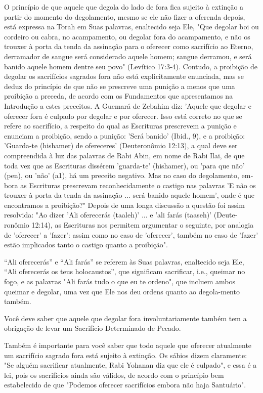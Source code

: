O princípio de que aquele que degola do lado de fora fica sujeito à
extinção a partir do momento do degolamento, mesmo se ele não fizer a
oferen­da depois, está expressa na Torah em Suas palavras, enaltecido
seja Ele, "Que de­golar boi ou cordeiro ou cabra, no acampamento, ou
degolar fora do acampa­mento, e não os trouxer à porta da tenda da
assinação para o oferecer como sa­crifício ao Eterno, derramador de
sangue será considerado aquele homem; san­gue derramou, e será banido
aquele homem dentre seu povo" (Levítico 17:3-4). Contudo, a proibição de
degolar os sacrifícios sagrados fora não está explicita­mente enunciada,
mas se deduz do princípio de que não se prescreve uma puni­ção a menos
que uma proibição a preceda, de acordo com os Fundamentos que
apresentamos na Introdução a estes preceitos. A Guemará de Zebahim diz:
'Aquele que degolar e oferecer fora é culpado por degolar e por
oferecer. Isso está corre­to no que se refere ao sacrifício, a respeito
do qual as Escrituras prescrevem a punição 
e enunciam a proibição, sendo a punição: 'Será banido' (Ibid., 9),
e a proi­bição: 'Guarda-te (hishamer) de ofereceres' (Deuteronômio
12:13), a qual deve ser compreendida à luz das palavras de Rabi Abin, em
nome de Rabi Ilai, de que toda vez que as Escrituras dissérem
'guarda-te' (hishamer), ou 'para que não' (pen), ou 'não' (a1), há um
preceito negativo. Mas no caso do degolamento, em­bora as Escrituras
prescrevam reconhecidamente o castigo nas palavras 'E não os trouxer à
porta da tenda da assinação ... será banido aquele homem', onde é que
encontramos a proibição?" Depois de uma longa discussão a questão foi
assim resolvida: "Ao dizer 'Ali oferecerás (taaleh)' ... e 'ali farás
(taaseh)' (Deute­ronômio 12:14), as Escrituras nos permitem argumentar o
seguinte, por analo­gia de 'oferecer' a 'fazer': assim como no caso de
'oferecer', também no caso de 'fazer' estão implicados tanto o castigo
quanto a proibição".

``Ali oferecerás'' e ``Ali farás'' se referem às Suas palavras, enaltecido
seja Ele, ``Ali oferecerás os teus holocaustos'', que significam
sacrificar, i.e., quei­mar no fogo, e as palavras "Ali farás tudo o que
eu te ordeno", que incluem ambos queimar e degolar, uma vez que Ele nos
deu ordens quanto ao degola-mento também.

Você deve saber que aquele que degolar fora involuntariamente tam­bém
tem a obrigação de levar um Sacrifício Determinado de Pecado.

Também é importante para você saber que todo aquele que ofere­cer
atualmente um sacrifício sagrado fora está sujeito à extinção. Os sábios
di­zem claramente: "Se alguém sacrificar atualmente, Rabi Yohanan diz
que ele é culpado", e essa é a lei, pois os sacrifícios ainda são
válidos, de acordo com o princípio bem estabelecido de que "Podemos
oferecer sacrifícios embora não haja Santuário".

